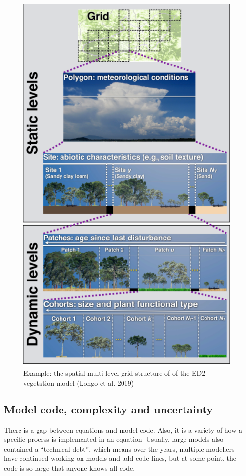 \documentclass[12pt,oneside]{book}
\begin{document}
\begin{figure}

{\centering \includegraphics[width=0.8\linewidth]{figures/chap1/grid_ED2} 

}

\caption{Example: the spatial multi-level grid structure of of the ED2 vegetation model (Longo et al. 2019)}\label{fig:f11}
\end{figure}

\subsection{Model code, complexity and
uncertainty}\label{model-code-complexity-and-uncertainty}

There is a gap between equations and model code. Also, it is a variety
of how a specific process is implemented in an equation. Usually, large
models also contained a ``technical debt'', which means over the years,
multiple modellers have continued working on models and add code lines,
but at some point, the code is so large that anyone knows all code.
\end{document}

